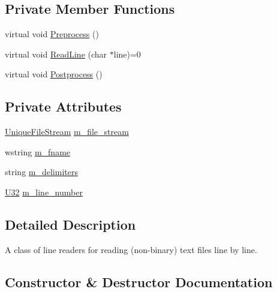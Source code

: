\subsection*{Private Member Functions}
\begin{DoxyCompactItemize}
\item 
virtual void \hyperlink{classmage_1_1_line_reader_a4de135cfb0434be786cfcfd7959031ef}{Preprocess} ()
\item 
virtual void \hyperlink{classmage_1_1_line_reader_acfb2f7279ec77d070a86d7db812d4745}{Read\+Line} (char $\ast$line)=0
\item 
virtual void \hyperlink{classmage_1_1_line_reader_adfde21013140a1058d3dd567204abfb5}{Postprocess} ()
\end{DoxyCompactItemize}
\subsection*{Private Attributes}
\begin{DoxyCompactItemize}
\item 
\hyperlink{namespacemage_a0ee1bd45ad7dbb3dc8c8e1770e3538d4}{Unique\+File\+Stream} \hyperlink{classmage_1_1_line_reader_a510ff5355c6d26d7c29dc692ef18a3e2}{m\+\_\+file\+\_\+stream}
\item 
wstring \hyperlink{classmage_1_1_line_reader_ad6f55ba12fc610ab2fc1c26a48d12321}{m\+\_\+fname}
\item 
string \hyperlink{classmage_1_1_line_reader_a6de3398ac59fdd98f8c40cff6f5c1075}{m\+\_\+delimiters}
\item 
\hyperlink{namespacemage_a41c104c036fba3756a74e19f793eeaa1}{U32} \hyperlink{classmage_1_1_line_reader_ab145590a7e115106c0987905fde98393}{m\+\_\+line\+\_\+number}
\end{DoxyCompactItemize}


\subsection{Detailed Description}
A class of line readers for reading (non-\/binary) text files line by line. 

\subsection{Constructor \& Destructor Documentation}
\hypertarget{classmage_1_1_line_reader_ab4a46321d7ea3ecda2d6390c78a7285b}{}\label{classmage_1_1_line_reader_ab4a46321d7ea3ecda2d6390c78a7285b} 
